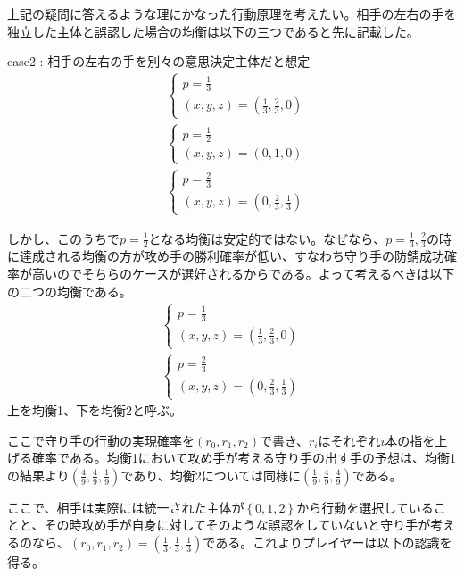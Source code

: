 \documentclass{jsarticle}
\begin{document}
上記の疑問に答えるような理にかなった行動原理を考えたい。相手の左右の手を独立した主体と誤認した場合の均衡は以下の三つであると先に記載した。
\begin{itembox}[l]{case2 : 相手の左右の手を別々の意思決定主体だと想定}
\begin{align*}
    	&\begin{cases}
		p = \frac{1}{3}\\
		(x, y, z) = (\frac{1}{3}, \frac{2}{3}, 0)
	\end{cases}\\[10pt]
	&\begin{cases}
		p = \frac{1}{2}\\
		(x, y, z) = (0, 1, 0)
	\end{cases}\\[10pt]
	&\begin{cases}
		p = \frac{2}{3}\\
		(x, y, z) = (0, \frac{2}{3}, \frac{1}{3})
	\end{cases}
\end{align*}
\end{itembox}
しかし、このうちで$p=\frac{1}{2}$となる均衡は安定的ではない。なぜなら、$p = \frac{1}{3}, \frac{2}{3}$の時に達成される均衡の方が攻め手の勝利確率が低い、すなわち守り手の防錆成功確率が高いのでそちらのケースが選好されるからである。よって考えるべきは以下の二つの均衡である。
\begin{align}
	\begin{cases}
		p = \frac{1}{3}\\
		(x, y, z) = (\frac{1}{3}, \frac{2}{3}, 0)
	\end{cases}\\[10pt]
	\begin{cases}
		p = \frac{2}{3}\\
		(x, y, z) = (0, \frac{2}{3}, \frac{1}{3})
	\end{cases}
\end{align}
上を均衡1、下を均衡2と呼ぶ。

ここで守り手の行動の実現確率を$(r_0, r_1, r_2)$で書き、$r_i$はそれぞれ$i$本の指を上げる確率である。均衡1において攻め手が考える守り手の出す手の予想は、均衡1の結果より$(\frac{4}{9}, \frac{4}{9}, \frac{1}{9})$であり、均衡2については同様に$(\frac{1}{9}, \frac{4}{9}, \frac{4}{9})$である。

ここで、相手は実際には統一された主体が$\left\{0,1,2\right\}$から行動を選択していることと、その時攻め手が自身に対してそのような誤認をしていないと守り手が考えるのなら、$(r_0, r_1, r_2) = (\frac{1}{3}, \frac{1}{3}, \frac{1}{3})$である。これよりプレイヤーは以下の認識を得る。
\end{document}
